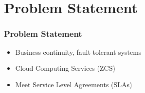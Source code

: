 \section{Problem Statement}

\begin{frame}
\frametitle{Problem Statement}

\begin{itemize}
  \item Business continuity, fault tolerant systems
  \item Cloud Computing Services (ZCS)
  \item Meet Service Level Agreements (SLAs)
\end{itemize}

\end{frame}